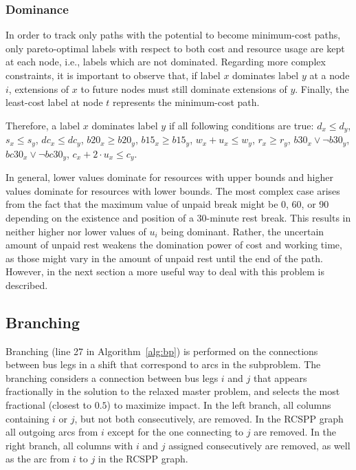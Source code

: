 \documentclass[]{amsart}
\theoremstyle{plain}
\begin{document}
\subsubsection{Dominance}

In order to track only paths with the potential to become minimum-cost paths, only pareto-optimal labels with respect to both cost and resource usage are kept at each node, i.e., labels which are not dominated. Regarding more complex constraints, it is important to observe that, if label $x$ dominates label $y$ at a node $i$, extensions of $x$ to future nodes must still dominate extensions of $y$. Finally, the least-cost label at node $t$ represents the minimum-cost path.

Therefore, a label $x$ dominates label $y$ if all following conditions are true: $d_x\leq d_y$, $s_x\leq s_y$, $\mathit{dc}_x\leq\mathit{dc}_y$, $\mathit{b20}_x\geq\mathit{b20}_y$, $\mathit{b15}_x\geq\mathit{b15}_y$, $w_x+u_x\leq w_y$, $r_x\geq r_y$, $\mathit{b30}_x\lor\neg\mathit{b30}_y$, $\mathit{bc30}_x\lor\neg\mathit{bc30}_y$, $c_x+2\cdot u_x\leq c_y$. 

In general, lower values dominate for resources with upper bounds and higher values dominate for resources with lower bounds. The most complex case arises from the fact that the maximum value of unpaid break might be 0, 60, or 90 depending on the existence and position of a 30-minute rest break. This results in neither higher nor lower values of $u_i$ being dominant. Rather, the uncertain amount of unpaid rest weakens the domination power of cost and working time, as those might vary in the amount of unpaid rest until the end of the path. However, in the next section a more useful way to deal with this problem is described.

\subsection{Branching}

Branching (line 27 in Algorithm~\ref{alg:bp}) is performed on the connections between bus legs in a shift that correspond to arcs in the subproblem. The branching considers a connection between bus legs $i$ and $j$ that appears fractionally in the solution to the relaxed master problem, and selects the most fractional (closest to $0.5$) to maximize impact. In the left branch, all columns containing $i$ or $j$, but not both consecutively, are removed. In the RCSPP graph all outgoing arcs from $i$ except for the one connecting to $j$ are removed. In the right branch, all columns with $i$ and $j$ assigned consecutively are removed, as well as the arc from $i$ to $j$ in the RCSPP graph.
\end{document}
